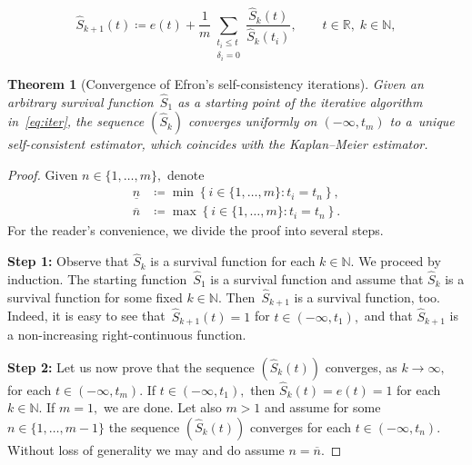 \documentclass[10pt,a4paper]{amsart}
\newtheorem{thm}{Theorem}
\def\as{\coloneqq}
\def\col{\colon}
\renewcommand{\hat}{\widehat}
\def\l{\left}
\def\nat{\mathbb{N}}
\def\ol{\overline}
\def\r{\right}
\newcommand{\rec}[1]{\frac{1}{#1}}
\def\rls{\mathbb{R}}
\def\un{\underline{n}}
\begin{document}
\begin{equation} \label{eq:iter}
 \hat{S}_{k+1}(t) \as e(t) + \rec{m} \sum_{\substack{t_i\le t \\ \delta_i=0}}\frac{\hat{S}_k(t)}{\hat{S}_k\l(t_i\r)},\qquad t\in\rls,\;k\in\nat,
\end{equation}

\begin{thm}[Convergence of Efron's self-consistency iterations] \label{thm:main} Given an arbitrary survival function~$\hat{S}_1$ as a starting point of the iterative algorithm in~\eqref{eq:iter}, the sequence $\l(\hat{S}_k\r)$ converges uniformly on $\l(-\infty,t_m\r)$ to a~unique self-consistent estimator, which coincides with the Kaplan--Meier estimator.
\end{thm}

\begin{proof}
Given $n\in\{1,\dots, m\},$ denote
\begin{align*}
 \un & \as \min\l\{i\in\{1,\dots,m\}\col t_i = t_n  \r\} ,\\
 \overline{n} & \as \max\l\{i\in\{1,\dots,m\}\col t_i = t_n  \r\} .
\end{align*}
For the reader's convenience, we divide the proof into several steps. 

\textbf{Step 1:} Observe that $\hat{S}_k$ is a survival function for each $k\in\nat.$ We proceed by induction. The starting function~$\hat{S}_1$ is a survival function and assume that $\hat{S}_k$ is a survival function for some fixed $k\in\nat.$ Then~$\hat{S}_{k+1}$ is a survival function, too. Indeed, it is easy to see that~$\hat{S}_{k+1}(t)=1$ for $t\in\l(-\infty,t_1\r),$ and that $\hat{S}_{k+1}$ is a non-increasing right-continuous function.

\textbf{Step 2:} Let us now prove that the sequence $\l(\hat{S}_k(t)\r)$ converges, as $k\to\infty,$ for each $t\in\l(-\infty,t_m\r).$ If $t\in\l(-\infty,t_1\r),$ then $\hat{S}_k(t)=e(t)=1$ for each $k\in\nat.$ If $m=1,$ we are done. Let also $m>1$ and assume for some $n\in\{1,\dots,m-1\}$ the sequence $\l(\hat{S}_k(t)\r)$ converges for each $t\in\l(-\infty,t_n\r).$ Without loss of generality we may and do assume $n=\ol{n}.$ 


\end{proof}
\end{document}
